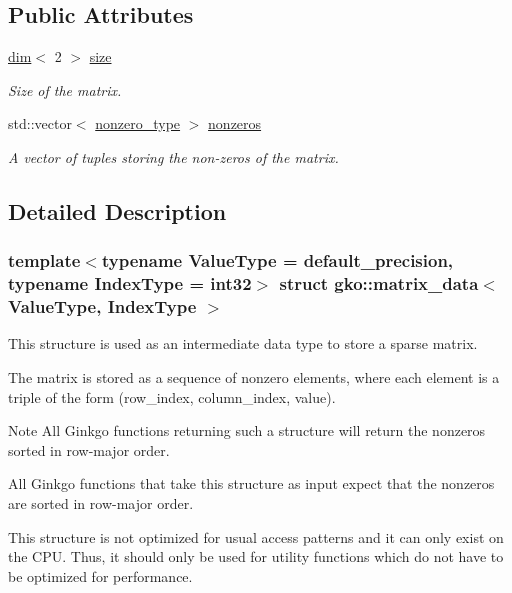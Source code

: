 \subsection*{Public Attributes}
\begin{DoxyCompactItemize}
\item 
\mbox{\label{structgko_1_1matrix__data_a30716bd9e39a7beed52fc56d737fc07b}} 
\hyperlink{structgko_1_1dim}{dim}$<$ 2 $>$ \hyperlink{structgko_1_1matrix__data_a30716bd9e39a7beed52fc56d737fc07b}{size}
\begin{DoxyCompactList}\small\item\em Size of the matrix. \end{DoxyCompactList}\item 
std\+::vector$<$ \hyperlink{structgko_1_1matrix__data_1_1nonzero__type}{nonzero\+\_\+type} $>$ \hyperlink{structgko_1_1matrix__data_a4f6be92270fa96bccdc502c83d248dc0}{nonzeros}
\begin{DoxyCompactList}\small\item\em A vector of tuples storing the non-\/zeros of the matrix. \end{DoxyCompactList}\end{DoxyCompactItemize}


\subsection{Detailed Description}
\subsubsection*{template$<$typename Value\+Type = default\+\_\+precision, typename Index\+Type = int32$>$\newline
struct gko\+::matrix\+\_\+data$<$ Value\+Type, Index\+Type $>$}

This structure is used as an intermediate data type to store a sparse matrix. 

The matrix is stored as a sequence of nonzero elements, where each element is a triple of the form (row\+\_\+index, column\+\_\+index, value).

\begin{DoxyNote}{Note}
All Ginkgo functions returning such a structure will return the nonzeros sorted in row-\/major order. 

All Ginkgo functions that take this structure as input expect that the nonzeros are sorted in row-\/major order. 

This structure is not optimized for usual access patterns and it can only exist on the C\+PU. Thus, it should only be used for utility functions which do not have to be optimized for performance.
\end{DoxyNote}


